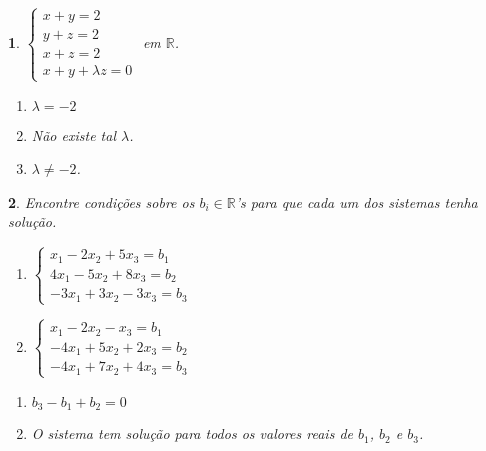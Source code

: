 \documentclass[12pt]{exam}
\newtheorem{exercicio}{}
\newcommand{\real}{\mathbb{R}}
\begin{document}
\begin{exercicio}\label{sistemasfim}
$\begin{cases}
  x + y = 2\\
  y + z = 2\\
  x + z = 2\\
  x + y + \lambda z = 0
\end{cases}$ em $\real$.
\begin{solucao}
  \begin{enumerate}[label={\alph*})]
    \item $\lambda = -2$
    \item N\~ao existe tal $\lambda$.
    \item $\lambda \ne -2$.
  \end{enumerate}
\end{solucao}
\end{exercicio}

\begin{exercicio}
  Encontre condi\c{c}\~oes sobre os $b_i \in \real$'s para que cada um dos sistemas tenha solu\c{c}\~ao.
  \begin{enumerate}[label={\alph*})]
    \item $\begin{cases}
      x_1 - 2x_2 + 5x_3 = b_1\\
      4x_1 - 5x_2 + 8x_3 = b_2\\
      -3x_1 + 3x_2 - 3x_3 = b_3
    \end{cases}$

    \item $\begin{cases}
      x_1 - 2x_2 - x_3 = b_1\\
      -4x_1 + 5x_2 + 2x_3 = b_2\\
      -4x_1 + 7x_2 + 4x_3 = b_3
    \end{cases}$
  \end{enumerate}
  \begin{solucao}
    \begin{enumerate}[label={\alph*})]
      \item $b_3 - b_1 + b_2 = 0$
      \item O sistema tem solu\c{c}\~ao para todos os valores reais de $b_1$, $b_2$ e $b_3$.
    \end{enumerate}
  \end{solucao}
\end{exercicio}
\end{document}
